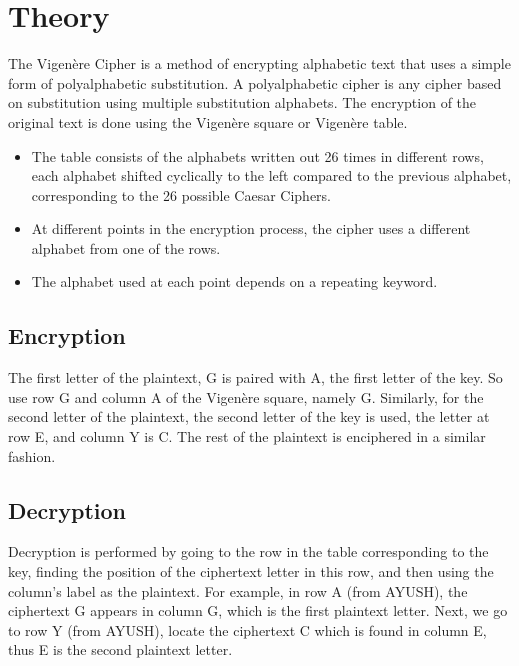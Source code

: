 \documentclass[12pt]{article}
\begin{document}
\setcounter{page}{2}
\pagestyle{fancy}
\fancyhf{}
\rhead{\thepage}

\section*{Theory}

The Vigenère Cipher is a method of encrypting alphabetic text that uses a simple form of polyalphabetic substitution. A polyalphabetic cipher is any cipher based on substitution using multiple substitution alphabets. The encryption of the original text is done using the Vigenère square or Vigenère table.

\begin{itemize}
    \item The table consists of the alphabets written out 26 times in different rows, each alphabet shifted cyclically to the left compared to the previous alphabet, corresponding to the 26 possible Caesar Ciphers.
    
    \item At different points in the encryption process, the cipher uses a different alphabet from one of the rows.
    
    \item The alphabet used at each point depends on a repeating keyword.
\end{itemize}

\subsection*{Encryption}

The first letter of the plaintext, G is paired with A, the first letter of the key. So use row G and column A of the Vigenère square, namely G. Similarly, for the second letter of the plaintext, the second letter of the key is used, the letter at row E, and column Y is C. The rest of the plaintext is enciphered in a similar fashion.

\subsection*{Decryption}

Decryption is performed by going to the row in the table corresponding to the key, finding the position of the ciphertext letter in this row, and then using the column's label as the plaintext. For example, in row A (from AYUSH), the ciphertext G appears in column G, which is the first plaintext letter. Next, we go to row Y (from AYUSH), locate the ciphertext C which is found in column E, thus E is the second plaintext letter.
\end{document}
